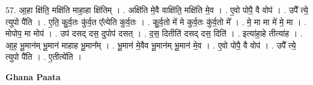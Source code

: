 \documentclass[17pt]{extarticle}
\begin{document}
57. आ॒हा क्षि॑ति॒ मक्षि॑ति माहा॒हा क्षि॑तिम् । . अक्षि॑ति मे॒वै वाक्षि॑ति॒ मक्षि॑ति मे॒व । . ए॒वो पोपै॒ वै वोप॑ । . उपै᳚ त्ये॒ त्युपो पै॑ति । . ए॒ति॒ कु॒र्व॒तः कु॑र्व॒त ए᳚त्येति कुर्व॒तः । . कु॒र्व॒तो मे॑ मे कुर्व॒तः कु॑र्व॒तो मे᳚ । . मे॒ मा मा मे॑ मे॒ मा । . मोपोप॒ मा मोप॑ । . उप॑ दसद् दस॒ दुपोप॑ दसत् । . द॒स॒ दितीति॑ दसद् दस॒ दिति॑ । . इत्या॑हा॒हे तीत्या॑ह । . आ॒ह॒ भू॒मान॑म् भू॒मान॑ माहाह भू॒मान᳚म् । . भू॒मान॑ मे॒वैव भू॒मान॑म् भू॒मान॑ मे॒व । . ए॒वो पोपै॒ वै वोप॑ । . उपै᳚ त्ये॒ त्युपो पै॑ति । . ए॒तीत्ये॑ति । \newline

\textbf{Ghana Paata } \newline
\end{document}
